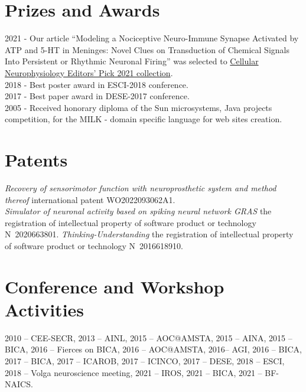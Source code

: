 \documentclass{moderncv}
\begin{document}
    
    \section{Prizes and Awards}

    2021 - Our article ``Modeling a Nociceptive Neuro-Immune Synapse Activated by ATP and 5-HT in Meninges: Novel Clues on Transduction of Chemical Signals Into Persistent or Rhythmic Neuronal Firing'' was selected to \href{https://www.frontiersin.org/research-topics/21434/cellular-neurophysiology-editors-pick-2021}{Cellular Neurophysiology Editors' Pick 2021 collection}.\\
    2018 - Best poster award in ESCI-2018 conference.\\
    2017 - Best paper award in DESE-2017 conference.\\
    2005 - Received honorary diploma of the Sun microsystems, Java projects competition, for the MILK - domain specific language for web sites creation.

    \section{Patents}

    \emph{Recovery of sensorimotor function with neuroprosthetic system and method thereof} international patent WO2022093062A1.\\
    \emph{Simulator of neuronal activity based on spiking neural network GRAS} the registration of intellectual property of software product or technology N~2020663801.
    \emph{Thinking-Understanding} the registration of intellectual property of software product or technology N~2016618910.\\
    
    \section{Conference and Workshop Activities}
    2010 -- CEE-SECR, 2013 -- AINL, 2015 -- AOC@AMSTA, 2015 -- AINA, 2015 -- BICA, 2016 -- Fierces on BICA, 2016 -- AOC@AMSTA, 2016-- AGI, 2016 -- BICA, 2017 -- BICA, 2017 -- ICAROB, 2017 -- ICINCO, 2017 -- DESE, 2018 -- ESCI, 2018 -- Volga neuroscience meeting, 2021 -- IROS, 2021 -- BICA, 2021 -- BF-NAICS.
\end{document}
